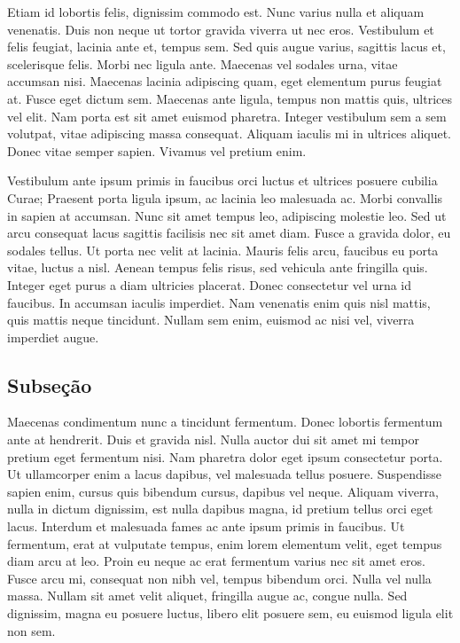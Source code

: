 Etiam id lobortis felis, dignissim commodo est. Nunc varius nulla et aliquam venenatis. Duis non neque ut tortor gravida viverra ut nec eros. Vestibulum et felis feugiat, lacinia ante et, tempus sem. Sed quis augue varius, sagittis lacus et, scelerisque felis. Morbi nec ligula ante. Maecenas vel sodales urna, vitae accumsan nisi. Maecenas lacinia adipiscing quam, eget elementum purus feugiat at. Fusce eget dictum sem. Maecenas ante ligula, tempus non mattis quis, ultrices vel elit. Nam porta est sit amet euismod pharetra. Integer vestibulum sem a sem volutpat, vitae adipiscing massa consequat. Aliquam iaculis mi in ultrices aliquet. Donec vitae semper sapien. Vivamus vel pretium enim.

Vestibulum ante ipsum primis in faucibus orci luctus et ultrices posuere cubilia Curae; Praesent porta ligula ipsum, ac lacinia leo malesuada ac. Morbi convallis in sapien at accumsan. Nunc sit amet tempus leo, adipiscing molestie leo. Sed ut arcu consequat lacus sagittis facilisis nec sit amet diam. Fusce a gravida dolor, eu sodales tellus. Ut porta nec velit at lacinia. Mauris felis arcu, faucibus eu porta vitae, luctus a nisl. Aenean tempus felis risus, sed vehicula ante fringilla quis. Integer eget purus a diam ultricies placerat. Donec consectetur vel urna id faucibus. In accumsan iaculis imperdiet. Nam venenatis enim quis nisl mattis, quis mattis neque tincidunt. Nullam sem enim, euismod ac nisi vel, viverra imperdiet augue.

\subsection{Subse\c{c}\~{a}o}
\label{sec:subsec01}

Maecenas condimentum nunc a tincidunt fermentum. Donec lobortis fermentum ante at hendrerit. Duis et gravida nisl. Nulla auctor dui sit amet mi tempor pretium eget fermentum nisi. Nam pharetra dolor eget ipsum consectetur porta. Ut ullamcorper enim a lacus dapibus, vel malesuada tellus posuere. Suspendisse sapien enim, cursus quis bibendum cursus, dapibus vel neque. Aliquam viverra, nulla in dictum dignissim, est nulla dapibus magna, id pretium tellus orci eget lacus. Interdum et malesuada fames ac ante ipsum primis in faucibus. Ut fermentum, erat at vulputate tempus, enim lorem elementum velit, eget tempus diam arcu at leo. Proin eu neque ac erat fermentum varius nec sit amet eros. Fusce arcu mi, consequat non nibh vel, tempus bibendum orci. Nulla vel nulla massa. Nullam sit amet velit aliquet, fringilla augue ac, congue nulla. Sed dignissim, magna eu posuere luctus, libero elit posuere sem, eu euismod ligula elit non sem.

